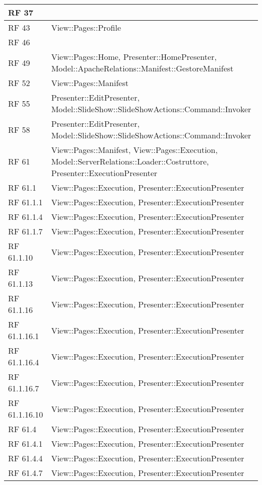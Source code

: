 {\begin{longtable} [c]{| p{3cm} | p{10cm} |}
 \hline 
RF 37 & \\ 
 \hline 
RF 43 & View::Pages::Profile\\ 
 \hline 
RF 46 & \\ 
 \hline 
RF 49 & View::Pages::Home, Presenter::HomePresenter, Model::ApacheRelations::Manifest::GestoreManifest\\ 
 \hline 
RF 52 & View::Pages::Manifest\\ 
 \hline 
RF 55 & Presenter::EditPresenter, Model::SlideShow::SlideShowActions::Command::Invoker\\ 
 \hline 
RF 58 & Presenter::EditPresenter, Model::SlideShow::SlideShowActions::Command::Invoker\\ 
 \hline 
RF 61 & View::Pages::Manifest, View::Pages::Execution, Model::ServerRelations::Loader::Costruttore, Presenter::ExecutionPresenter\\ 
 \hline 
RF 61.1 & View::Pages::Execution, Presenter::ExecutionPresenter\\ 
 \hline 
RF 61.1.1 & View::Pages::Execution, Presenter::ExecutionPresenter\\ 
 \hline 
RF 61.1.4 & View::Pages::Execution, Presenter::ExecutionPresenter\\ 
 \hline 
RF 61.1.7 & View::Pages::Execution, Presenter::ExecutionPresenter\\ 
 \hline 
RF 61.1.10 & View::Pages::Execution, Presenter::ExecutionPresenter\\ 
 \hline 
RF 61.1.13 & View::Pages::Execution, Presenter::ExecutionPresenter\\ 
 \hline 
RF 61.1.16 & View::Pages::Execution, Presenter::ExecutionPresenter\\ 
 \hline 
RF 61.1.16.1 & View::Pages::Execution, Presenter::ExecutionPresenter\\ 
 \hline 
RF 61.1.16.4 & View::Pages::Execution, Presenter::ExecutionPresenter\\ 
 \hline 
RF 61.1.16.7 & View::Pages::Execution, Presenter::ExecutionPresenter\\ 
 \hline 
RF 61.1.16.10 & View::Pages::Execution, Presenter::ExecutionPresenter\\ 
 \hline 
RF 61.4 & View::Pages::Execution, Presenter::ExecutionPresenter\\ 
 \hline 
RF 61.4.1 & View::Pages::Execution, Presenter::ExecutionPresenter\\ 
 \hline 
RF 61.4.4 & View::Pages::Execution, Presenter::ExecutionPresenter\\ 
 \hline 
RF 61.4.7 & View::Pages::Execution, Presenter::ExecutionPresenter\\ 

\end{longtable}}
